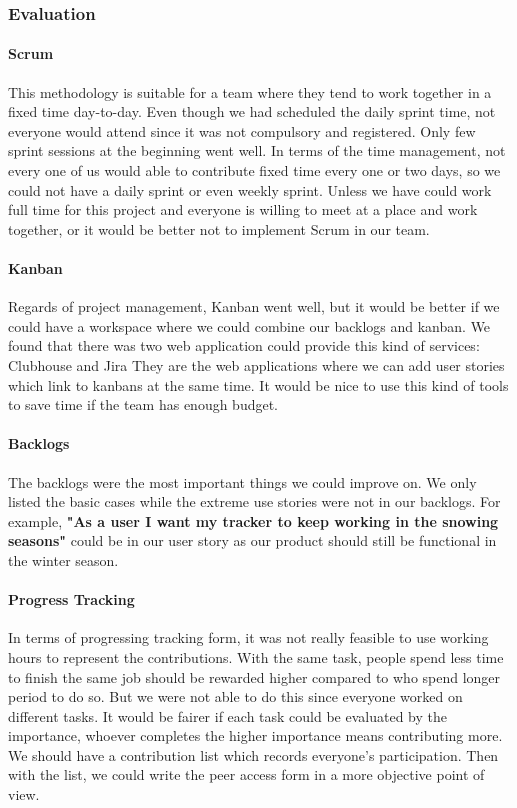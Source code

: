 \documentclass[12pt,a4paper]{article}
\begin{document}
      \subsubsection{Evaluation}

        \paragraph{Scrum} This methodology is suitable for a team where they tend to work together in a fixed time day-to-day. Even though we had scheduled the daily sprint time, not everyone would attend since it was not compulsory and registered. Only few sprint sessions at the beginning went well. In terms of the time management, not every one of us would able to contribute fixed time every one or two days, so we could not have a daily sprint or even weekly sprint. Unless we have could work full time for this project and everyone is willing to meet at a place and work together, or it would be better not to implement Scrum in our team. 
        
        \paragraph{Kanban} Regards of project management, Kanban went well, but it would be better if we could have a workspace where we could combine our backlogs and kanban. We found that there was two web application could provide this kind of services: Clubhouse and Jira They are the web applications where we can add user stories which link to kanbans at the same time. It would be nice to use this kind of tools to save time if the team has enough budget.
        
        \paragraph{Backlogs} The backlogs were the most important things we could improve on. We only listed the basic cases while the extreme use stories were not in our backlogs. For example, {\bf "As a user I want my tracker to keep working in the snowing seasons"} could be in our user story as our product should still be functional in the winter season. 

        \paragraph{Progress Tracking} In terms of progressing tracking form, it was not really feasible to use working hours to represent the contributions. With the same task, people spend less time to finish the same job should be rewarded higher compared to who spend longer period to do so. But we were not able to do this since everyone worked on different tasks. It would be fairer if each task could be evaluated by the importance, whoever completes the higher importance means contributing more. We should have a contribution list which records everyone's participation. Then with the list, we could write the peer access form in a more objective point of view.
\end{document}
